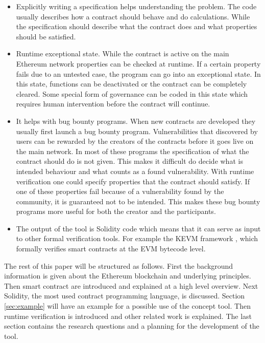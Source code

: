 \documentclass[a4paper]{article}
\begin{document}
\begin{itemize}
    \item Explicitly writing a specification helps understanding the problem. The code usually describes how a contract should behave and do calculations. While the specification should describe what the contract does and what properties should be satisfied.
    \item Runtime exceptional state. While the contract is active on the main Ethereum network properties can be checked at runtime. If a certain property fails due to an untested case, the program can go into an exceptional state. In this state, functions can be deactivated or the contract can be completely cleared. Some special form of governance can be coded in this state which requires human intervention before the contract will continue.
    \item It helps with bug bounty programs. When new contracts are developed they usually first launch a bug bounty program. Vulnerabilities that discovered by users can be rewarded by the creators of the contracts before it goes live on the main network. In most of these programs the specification of what the contract should do is not given. This makes it difficult do decide what is intended behaviour and what counts as a found vulnerability. With runtime verification one could specify properties that the contract should satisfy. If one of these properties fail because of a vulnerability found by the community, it is guaranteed not to be intended. This makes these bug bounty programs more useful for both the creator and the participants. 
    \item  The output of the tool is Solidity code which means that it can serve as input to other formal verification tools. For example the KEVM framework \cite{hildenbrandt2017kevm}, which formally verifies smart contracts at the EVM bytecode level. 
\end{itemize}
The rest of this paper will be structured as follows. First the background information is given about the Ethereum blockchain and underlying principles. Then smart contract are introduced and explained at a high level overview. Next Solidity, the most used contract programming language, is discussed. Section \ref{sec:example} will have an example for a possible use of the concept tool. Then runtime verification is introduced and other related work is explained. The last section contains the research questions and a planning for the development of the tool. 
\end{document}
